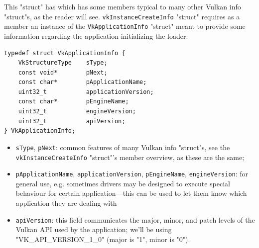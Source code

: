 \documentclass[12pt,letterpaper]{article}
\newcommand{\cil}[1]{\texttt{#1}}
\begin{document}
This "struct" has which has some members typical to many other Vulkan info "struct"s, as the reader will see. \cil{vkInstanceCreateInfo} "struct" requires as a member an instance of the \cil{VkApplicationInfo} "struct" meant to provide some information regarding the application initializing the loader:
		\begin{verbatim}
typedef struct VkApplicationInfo {
	VkStructureType    sType;
	const void*        pNext;
	const char*        pApplicationName;
	uint32_t           applicationVersion;
	const char*        pEngineName;
	uint32_t           engineVersion;
	uint32_t           apiVersion;
} VkApplicationInfo;
		\end{verbatim}
	\begin{itemize}
		\item \cil{sType}, \cil{pNext}: common features of many Vulkan info "struct"s, see the \cil{vkInstanceCreateInfo} "struct"'s member overview, as these are the same;
		
		\item \cil{pApplicationName}, \cil{applicationVersion}, \cil{pEngineName}, \cil{engineVersion}: for general use, e.g. sometimes drivers may be designed to execute special behaviour for certain application---this can be used to let them know which application they are dealing with
		
		\item \cil{apiVersion}:  this field communicates the major, minor, and patch levels of the Vulkan API used by the application; we'll be using "VK\_API\_VERSION\_1\_0" (major is "1", minor is "0").
	\end{itemize}
\end{document}
